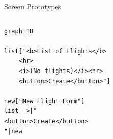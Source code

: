 \documentclass[aspectratio=43,handout,bigger]{beamer}
\begin{document}
\begin{frame}[fragile]{Screen Prototypes}
  \begin{columns}
    \begin{column}{.5\textwidth}
\begin{verbatim}
graph TD

list["<b>List of Flights</b>
    <hr>
    <i>(No flights)</i><hr>
    <button>Create</button>"]

new["New Flight Form"]
list-->|"
<button>Create</button>
"|new
\end{verbatim}
  \end{column}
  \begin{column}{.5\textwidth}
  \end{column}
  \end{columns}
\end{frame}

\end{document}
